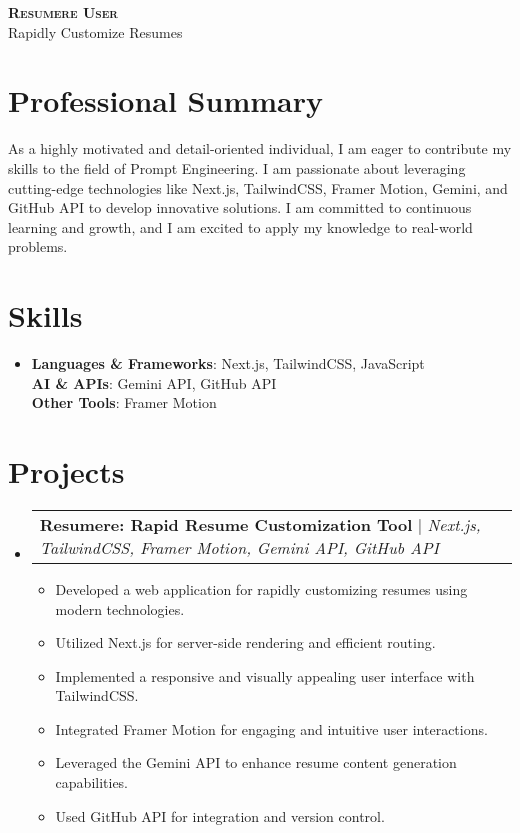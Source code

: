 \documentclass[letterpaper,11pt]{article}
\makeatletter
\newcommand{\resumeItem}[1]{
\item\small{
{#1 \vspace{-2pt}}
}
}
\newcommand{\resumeProjectHeading}[2]{
\item
\begin{tabular*}{0.97\textwidth}{l@{\extracolsep{\fill}}r}
\small#1 & #2 \\
\end{tabular*}\vspace{-7pt}
}
\newcommand{\resumeSubHeadingListStart}{\begin{itemize}[leftmargin=0.15in, label={}]}
\newcommand{\resumeSubHeadingListEnd}{\end{itemize}}
\newcommand{\resumeItemListStart}{\begin{itemize}}
\newcommand{\resumeItemListEnd}{\end{itemize}\vspace{-5pt}}
\makeatother
\begin{document}
\begin{center}
\textbf{\Huge \scshape Resumere User} \\ \vspace{1pt}
\small Rapidly Customize Resumes
\end{center}


\section{Professional Summary} %
As a highly motivated and detail-oriented individual, I am eager to contribute my skills to the field of Prompt Engineering. I am passionate about leveraging cutting-edge technologies like Next.js, TailwindCSS, Framer Motion, Gemini, and GitHub API to develop innovative solutions. I am committed to continuous learning and growth, and I am excited to apply my knowledge to real-world problems.

\section{Skills}
\begin{itemize}[leftmargin=0.15in, label={}]
\item{
\textbf{Languages \& Frameworks}{: Next.js, TailwindCSS, JavaScript} \\
\textbf{AI \& APIs}{: Gemini API, GitHub API} \\
\textbf{Other Tools}{: Framer Motion}
} \\
\end{itemize}

\section{Projects}
\resumeSubHeadingListStart
\resumeProjectHeading{\textbf{Resumere: Rapid Resume Customization Tool} $|$ \emph{Next.js, TailwindCSS, Framer Motion, Gemini API, GitHub API}}{}
\resumeItemListStart
\resumeItem{Developed a web application for rapidly customizing resumes using modern technologies.}
\resumeItem{Utilized Next.js for server-side rendering and efficient routing.}
\resumeItem{Implemented a responsive and visually appealing user interface with TailwindCSS.}
\resumeItem{Integrated Framer Motion for engaging and intuitive user interactions.}
\resumeItem{Leveraged the Gemini API to enhance resume content generation capabilities.}
\resumeItem{Used GitHub API for integration and version control.}
\resumeItemListEnd
\resumeSubHeadingListEnd
\end{document}

